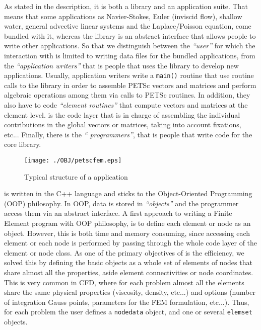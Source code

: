 

%
As stated in the \pfem{} description, it is both a library and an
application suite. That means that some applications as Navier-Stokes,
Euler (inviscid flow), shallow water, general advective linear systems
and the Laplace/Poisson equation, come bundled with it, whereas the
library is an abstract interface that allows people to write other
applications. So that we distinguish between the \emph{``user''} for
which the interaction with \pfem{} is limited to writing data files
for the bundled applications, from the \emph{``application writers''}
that is people that uses the library to develop new
applications. Usually, application writers write a \verb+main()+
routine that use routine calls to the \pfem{} library in order to
assemble PETSc vectors and matrices and perform algebraic operations
among them via calls to PETSc routines.  In addition, they also have
to code \emph{``element routines''} that compute vectors and matrices
at the element level. \pfem{} is the code layer that is in charge of
assembling the individual contributions in the global vectors or
matrices, taking into account fixations, etc...  Finally, there is the
\emph{``\pfem{} programmers''}, that is people that write code for the
core library.

\begin{figure*}[htb]
\centerline{\texttt{[image: ./OBJ/petscfem.eps]}}
\caption{Typical structure of a \pfem{} application}
\label{fg:petscfem}
\end{figure*}


\pfem{} is written in the C++ language and sticks to the
Object-Oriented Programming (OOP) philosophy. In OOP, data is stored
in \emph{``objects''} and the programmer access them via an abstract
interface. A first approach to writing a Finite Element program with
OOP philosophy, is to define each element or node as an
object. However, this is both time and memory consuming, since
accessing each element or each node is performed by passing through
the whole code layer of the element or node class. As one of the
primary objectives of \pfem{} is the efficiency, we solved this by
defining the basic objects as a whole set of elements of nodes that
share almost all the properties, aside element connectivities or node
coordinates. This is very common in CFD, where for each problem almost
all the elements share the same physical properties (viscosity,
density, etc...) and options (number of integration Gauss points,
parameters for the FEM formulation, etc...). Thus, for each problem
the user defines a \verb+nodedata+ object, and one or several
\verb+elemset+ objects. 

